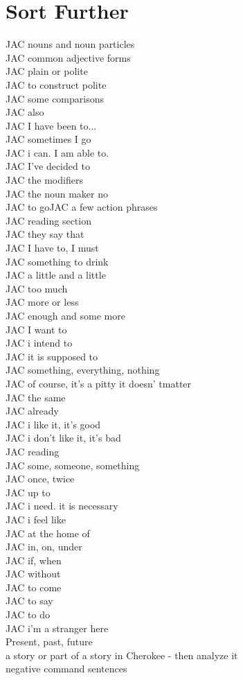\chapter*{Sort Further}
JAC nouns and noun particles\\
JAC common adjective forms\\
JAC plain or polite\\
JAC to construct polite\\
JAC some comparisons\\
JAC also\\
JAC I have been to...\\
JAC sometimes I go\\
JAC i can.  I am able to.\\
JAC I've decided to\\
JAC the modifiers\\
JAC the noun maker no\\
JAC to goJAC a few action phrases\\
JAC reading section\\
JAC they say that\\
JAC I have to, I must\\
JAC something to drink\\
JAC a little and a little\\
JAC too much\\
JAC more or less\\
JAC enough and some more\\
JAC I want to\\
JAC i intend to\\
JAC it is supposed to\\
JAC something, everything, nothing\\
JAC of course, it's a pitty it doesn' tmatter\\
JAC the same\\
JAC already\\
JAC i like it, it's good\\
JAC i don't like it, it's bad\\
JAC reading\\
JAC some, someone, something\\
JAC once, twice\\
JAC up to\\
JAC i need. it is necessary\\
JAC i feel like\\
JAC at the home of\\
JAC in, on, under\\
JAC if, when\\
JAC without\\
JAC to come\\
JAC to say\\
JAC to do\\
JAC i'm a stranger here\\
Present, past, future\\
a story or part of a story in Cherokee - then analyze it\\
negative command sentences\\
